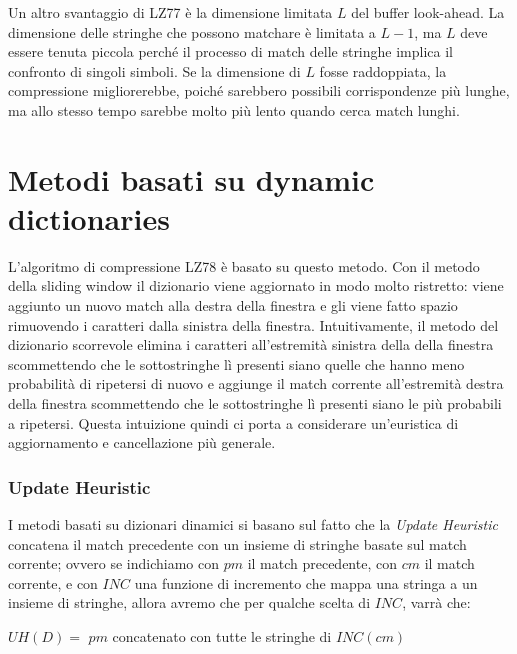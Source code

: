 \vspace{5mm}

Un altro svantaggio di LZ77 è la dimensione limitata \(L\) del buffer look-ahead.
La dimensione delle stringhe che possono matchare è limitata a \(L-1\), ma \(L\) deve essere tenuta piccola
perché il processo di match delle stringhe implica il confronto di singoli simboli.
Se la dimensione di \(L\) fosse raddoppiata, la compressione migliorerebbe, poiché sarebbero possibili corrispondenze più lunghe, ma allo stesso tempo sarebbe molto più lento quando cerca
match lunghi.




\section{Metodi basati su dynamic dictionaries}
L'algoritmo di compressione LZ78 è basato su questo metodo. Con il metodo della sliding window il dizionario viene aggiornato in modo molto ristretto: viene aggiunto un nuovo match alla destra della finestra e gli viene fatto spazio rimuovendo i caratteri dalla sinistra della finestra.
Intuitivamente, il metodo del dizionario scorrevole elimina i caratteri all'estremità sinistra della
della finestra scommettendo che le sottostringhe lì presenti siano quelle che hanno meno probabilità di ripetersi
di nuovo e aggiunge il match corrente all'estremità destra della finestra scommettendo
che le sottostringhe lì presenti siano le più probabili a ripetersi. Questa intuizione quindi ci porta a considerare un'euristica di aggiornamento e cancellazione più generale.

\subsubsection{Update Heuristic}

I metodi basati su dizionari dinamici si basano sul fatto che la \textit{Update Heuristic} concatena il match precedente con un insieme di stringhe basate sul match corrente; ovvero se indichiamo con \(pm\) il match precedente, con \(cm\) il match corrente, e con \(INC\) una funzione di incremento che mappa una stringa a un insieme di stringhe, allora avremo che per qualche scelta di \(INC\), varrà che:

\vspace{3mm}

\begin{center}
\(UH(D) = \) {\(pm\) concatenato con tutte le stringhe di \(INC(cm)\)}
\end{center}

